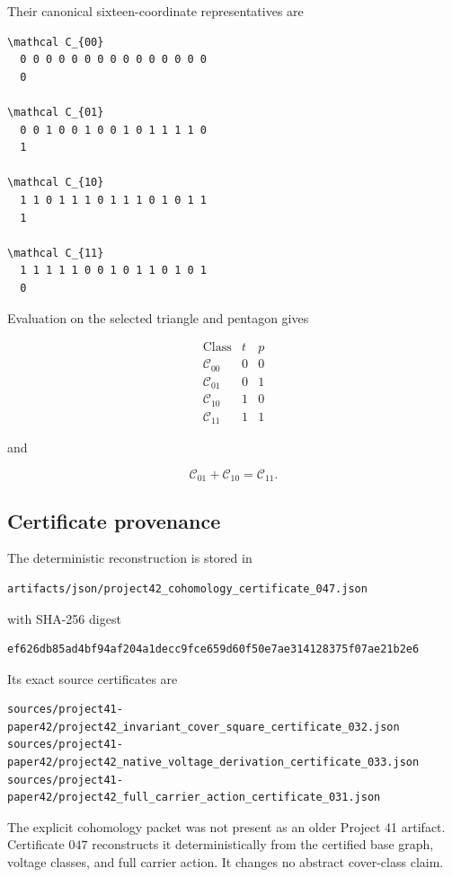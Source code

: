 Their canonical sixteen-coordinate representatives are

\begin{verbatim}
\mathcal C_{00}
  0 0 0 0 0 0 0 0 0 0 0 0 0 0 0
  0

\mathcal C_{01}
  0 0 1 0 0 1 0 0 1 0 1 1 1 1 0
  1

\mathcal C_{10}
  1 1 0 1 1 1 0 1 1 1 0 1 0 1 1
  1

\mathcal C_{11}
  1 1 1 1 1 0 0 1 0 1 1 0 1 0 1
  0
\end{verbatim}

Evaluation on the selected triangle and pentagon gives

\[
\begin{array}{c|cc}
\text{Class} & t & p\\
\hline
\mathcal C_{00} & 0 & 0\\
\mathcal C_{01} & 0 & 1\\
\mathcal C_{10} & 1 & 0\\
\mathcal C_{11} & 1 & 1
\end{array}
\]

and

\[
\mathcal C_{01}+\mathcal C_{10}
=
\mathcal C_{11}.
\]

\subsection{Certificate provenance}

The deterministic reconstruction is stored in

\begin{verbatim}
artifacts/json/project42_cohomology_certificate_047.json
\end{verbatim}

with SHA-256 digest

\begin{verbatim}
ef626db85ad4bf94af204a1decc9fce659d60f50e7ae314128375f07ae21b2e6
\end{verbatim}

Its exact source certificates are

\begin{verbatim}
sources/project41-paper42/project42_invariant_cover_square_certificate_032.json
sources/project41-paper42/project42_native_voltage_derivation_certificate_033.json
sources/project41-paper42/project42_full_carrier_action_certificate_031.json
\end{verbatim}

The explicit cohomology packet was not present as an older Project 41
artifact. Certificate \(047\) reconstructs it deterministically from the
certified base graph, voltage classes, and full carrier action. It
changes no abstract cover-class claim.
